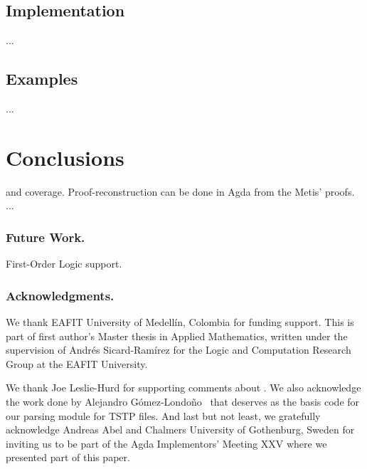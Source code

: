 \documentclass[runningheads,a4paper]{llncs}
\begin{document}
\subsection{Implementation}
...
\subsection{Examples}
...


\section{Conclusions}
\label{secconclusion}
 and  coverage.
Proof-reconstruction can be done in Agda from the Metis' proofs.
...

\subsubsection*{Future Work.}
First-Order Logic support.

\subsubsection*{Acknowledgments.}
We thank EAFIT University of Medell\'in, Colombia for funding support. This is
part of first author's Master thesis in Applied Mathematics, written under the
supervision of Andr\'es Sicard-Ram\'irez for the Logic and Computation Research
Group at the EAFIT University.

We thank Joe Leslie-Hurd for supporting comments about .
We also acknowledge the work done by Alejandro G\'omez-Londo\~no~
\cite{Gomez-Londono2015} that deserves as the basis code for our parsing module
for TSTP files.
And last but not least, we gratefully acknowledge Andreas Abel and Chalmers
University of Gothenburg, Sweden for inviting us to be part of the Agda
Implementors’ Meeting XXV where we presented part of this paper.



\end{document}
